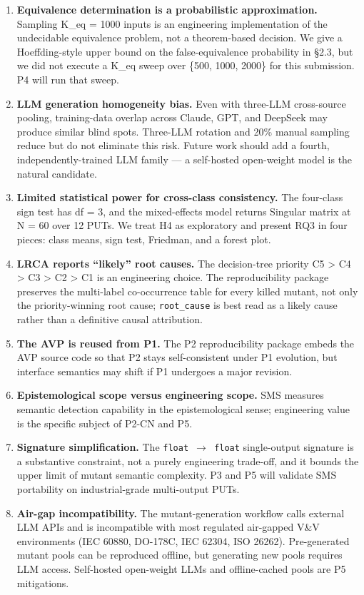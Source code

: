 \documentclass[review,12pt,authoryear]{elsarticle}
\begin{document}
\begin{enumerate}
\def\labelenumi{(\arabic{enumi})}
\item
  \textbf{Equivalence determination is a probabilistic approximation.}
  Sampling K\_eq = 1000 inputs is an engineering implementation of the
  undecidable equivalence problem, not a theorem-based decision. We give
  a Hoeffding-style upper bound on the false-equivalence probability in
  §2.3, but we did not execute a K\_eq sweep over \{500, 1000, 2000\}
  for this submission. P4 will run that sweep.
\item
  \textbf{LLM generation homogeneity bias.} Even with three-LLM
  cross-source pooling, training-data overlap across Claude, GPT, and
  DeepSeek may produce similar blind spots. Three-LLM rotation and 20\%
  manual sampling reduce but do not eliminate this risk. Future work
  should add a fourth, independently-trained LLM family --- a
  self-hosted open-weight model is the natural candidate.
\item
  \textbf{Limited statistical power for cross-class consistency.} The
  four-class sign test has df = 3, and the mixed-effects model returns
  Singular matrix at N = 60 over 12 PUTs. We treat H4 as exploratory and
  present RQ3 in four pieces: class means, sign test, Friedman, and a
  forest plot.
\item
  \textbf{LRCA reports ``likely'' root causes.} The decision-tree
  priority C5 \textgreater{} C4 \textgreater{} C3 \textgreater{} C2
  \textgreater{} C1 is an engineering choice. The reproducibility
  package preserves the multi-label co-occurrence table for every killed
  mutant, not only the priority-winning root cause; \texttt{root\_cause}
  is best read as a likely cause rather than a definitive causal
  attribution.
\item
  \textbf{The AVP is reused from P1.} The P2 reproducibility package
  embeds the AVP source code so that P2 stays self-consistent under P1
  evolution, but interface semantics may shift if P1 undergoes a major
  revision.
\item
  \textbf{Epistemological scope versus engineering scope.} SMS measures
  semantic detection capability in the epistemological sense;
  engineering value is the specific subject of P2-CN and P5.
\item
  \textbf{Signature simplification.} The \texttt{float\ $\to$\ float}
  single-output signature is a substantive constraint, not a purely
  engineering trade-off, and it bounds the upper limit of mutant
  semantic complexity. P3 and P5 will validate SMS portability on
  industrial-grade multi-output PUTs.
\item
  \textbf{Air-gap incompatibility.} The mutant-generation workflow calls
  external LLM APIs and is incompatible with most regulated air-gapped
  V\&V environments (IEC 60880, DO-178C, IEC 62304, ISO 26262).
  Pre-generated mutant pools can be reproduced offline, but generating
  new pools requires LLM access. Self-hosted open-weight LLMs and
  offline-cached pools are P5 mitigations.
\end{enumerate}
\end{document}

